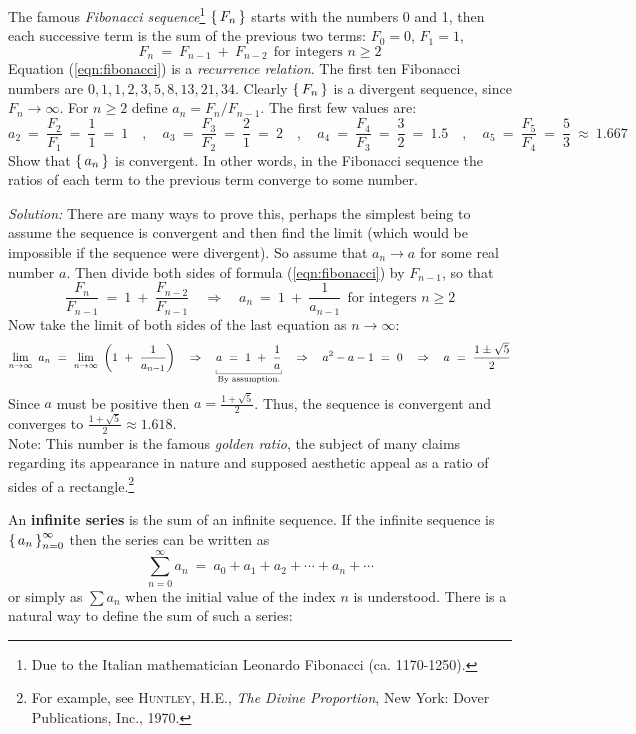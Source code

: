 \begin{exmp}\label{exmp:fib}
\noindent The famous \emph{Fibonacci sequence}\footnote{Due to the Italian
mathematician Leonardo Fibonacci (ca. 1170-1250).} $\left\lbrace\mspace{3mu}F_n\mspace{3mu}\right\rbrace$ starts with the
numbers 0 and 1, then each successive term is the sum of the previous two
terms: $F_0 = 0$, $F_1 = 1$,
\begin{equation}\label{eqn:fibonacci}
F_n ~=~ F_{n-1} ~+~ F_{n-2} ~~\text{for integers $n \ge 2$}
\end{equation}
Equation (\ref{eqn:fibonacci}) is a \emph{recurrence relation}.
The first ten Fibonacci numbers are $0,1,1,2,3,5,8,13,21,34$. Clearly
$\left\lbrace\mspace{3mu}F_n\mspace{3mu}\right\rbrace$ is a divergent sequence, since $F_n \rightarrow \infty$. For
$n \ge 2$ define $a_n = F_n/F_{n-1}$. The first few values are:
\[
a_2 ~=~ \frac{F_2}{F_1} ~=~ \frac{1}{1} ~=~ 1 \quad,\quad
a_3 ~=~ \frac{F_3}{F_2} ~=~ \frac{2}{1} ~=~ 2 \quad,\quad
a_4 ~=~ \frac{F_4}{F_3} ~=~ \frac{3}{2} ~=~ 1.5 \quad,\quad
a_5 ~=~ \frac{F_5}{F_4} ~=~ \frac{5}{3} ~\approx~ 1.667
\]
Show that $\left\lbrace\mspace{3mu}a_n\mspace{3mu}\right\rbrace$ is
convergent. In other words, in the Fibonacci sequence the ratios of each term to
the previous term converge to some number.\vspace{1mm}
\par\noindent\emph{Solution:} There are many ways to prove this, perhaps the
simplest being to assume the sequence is convergent and then find the limit
(which would be impossible if the sequence were divergent). So assume that
$a_n \rightarrow a$ for some real number $a$. Then divide both sides of
formula (\ref{eqn:fibonacci}) by $F_{n-1}$, so that
\[
\frac{F_n}{F_{n-1}} ~=~ 1 ~+~ \frac{F_{n-2}}{F_{n-1}} \quad\Rightarrow\quad
a_n ~=~ 1 ~+~ \frac{1}{a_{n-1}} ~~\text{for integers $n \ge 2$}
\]
Now take the limit of both sides of the last equation as $n \to \infty$:
\[
\lim_{n \to \infty} ~a_n ~=~ \lim_{n \to \infty} ~\left(1 ~+~ \frac{1}{a_{n-1}}\right)
\quad\Rightarrow\quad
\underbracket[0.3pt]{a ~=~ 1 ~+~ \frac{1}{a}}_\text{\scriptsize By assumption.} \quad\Rightarrow\quad a^2 - a - 1 ~=~ 0
\quad\Rightarrow\quad
a ~=~ \frac{1 \pm \sqrt{5}}{2}
\]
Since $a$ must be positive then $a = \frac{1 +\sqrt{5}}{2}$. Thus, the sequence
is convergent and converges to $\frac{1 +\sqrt{5}}{2} \approx 1.618$. \\Note:
This number is the famous \emph{golden ratio}, the subject of many claims
regarding its appearance in nature and supposed aesthetic appeal as a ratio of
sides of a rectangle.\footnote{For example, see \textsc{Huntley, H.E.},
\emph{The Divine Proportion}, New York: Dover Publications, Inc.,
1970.}
\end{exmp}
\divider
\newpage
An \textbf{infinite series} is the sum of an infinite
sequence. If the infinite sequence is $\left\lbrace\mspace{3mu}a_n\mspace{3mu}\right\rbrace_{n=0}^{\infty}$ then the series
can be written as
\[
\sum_{n=0}^{\infty} a_n ~=~ a_0 + a_1 + a_2 + \cdots + a_n + \cdots
\]
or simply as $\sum a_n$ when the initial value of the index $n$ is understood.
There is a natural way to define the sum of such a series:

